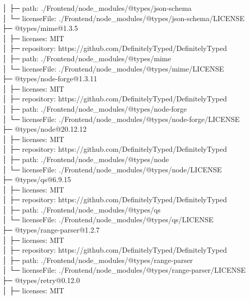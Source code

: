 \documentclass[
    paper=a4,
    twoside=false,
    parskip=half,
    listof=entryprefix,
    listof=totoc,
    index=totoc,
    bibliography=totoc,
    headsepline,
]{scrbook}
\begin{document}
    │  ├─ path: ./Frontend/node\_modules/@types/json-schema\\
    │  └─ licenseFile: ./Frontend/node\_modules/@types/json-schema/LICENSE\\
    ├─ @types/mime@1.3.5\\
    │  ├─ licenses: MIT\\
    │  ├─ repository: https://github.com/DefinitelyTyped/DefinitelyTyped\\
    │  ├─ path: ./Frontend/node\_modules/@types/mime\\
    │  └─ licenseFile: ./Frontend/node\_modules/@types/mime/LICENSE\\
    ├─ @types/node-forge@1.3.11\\
    │  ├─ licenses: MIT\\
    │  ├─ repository: https://github.com/DefinitelyTyped/DefinitelyTyped\\
    │  ├─ path: ./Frontend/node\_modules/@types/node-forge\\
    │  └─ licenseFile: ./Frontend/node\_modules/@types/node-forge/LICENSE\\
    ├─ @types/node@20.12.12\\
    │  ├─ licenses: MIT\\
    │  ├─ repository: https://github.com/DefinitelyTyped/DefinitelyTyped\\
    │  ├─ path: ./Frontend/node\_modules/@types/node\\
    │  └─ licenseFile: ./Frontend/node\_modules/@types/node/LICENSE\\
    ├─ @types/qs@6.9.15\\
    │  ├─ licenses: MIT\\
    │  ├─ repository: https://github.com/DefinitelyTyped/DefinitelyTyped\\
    │  ├─ path: ./Frontend/node\_modules/@types/qs\\
    │  └─ licenseFile: ./Frontend/node\_modules/@types/qs/LICENSE\\
    ├─ @types/range-parser@1.2.7\\
    │  ├─ licenses: MIT\\
    │  ├─ repository: https://github.com/DefinitelyTyped/DefinitelyTyped\\
    │  ├─ path: ./Frontend/node\_modules/@types/range-parser\\
    │  └─ licenseFile: ./Frontend/node\_modules/@types/range-parser/LICENSE\\
    ├─ @types/retry@0.12.0\\
    │  ├─ licenses: MIT\\
\end{document}
